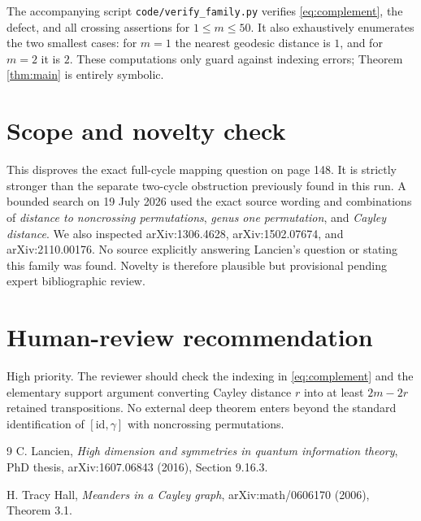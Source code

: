\documentclass[11pt]{article}
\newcommand{\id}{\mathrm{id}}
\begin{document}
The accompanying script \texttt{code/verify\_family.py} verifies
\eqref{eq:complement}, the defect, and all crossing assertions for
$1\leq m\leq50$.  It also exhaustively enumerates the two smallest cases:
for $m=1$ the nearest geodesic distance is $1$, and for $m=2$ it is $2$.
These computations only guard against indexing errors; Theorem
\ref{thm:main} is entirely symbolic.

\section{Scope and novelty check}

This disproves the exact full-cycle mapping question on page 148.  It is
strictly stronger than the separate two-cycle obstruction previously found
in this run.  A bounded search on 19 July 2026 used the exact source wording
and combinations of \emph{distance to noncrossing permutations}, \emph{genus
one permutation}, and \emph{Cayley distance}.  We also inspected
arXiv:1306.4628, arXiv:1502.07674, and arXiv:2110.00176.  No source explicitly
answering Lancien's question or stating this family was found.  Novelty is
therefore plausible but provisional pending expert bibliographic review.

\section{Human-review recommendation}

High priority.  The reviewer should check the indexing in
\eqref{eq:complement} and the elementary support argument converting Cayley
distance $r$ into at least $2m-2r$ retained transpositions.  No external deep
theorem enters beyond the standard identification of $[\id,\gamma]$ with
noncrossing permutations.

\begin{thebibliography}{9}
C. Lancien,
\emph{High dimension and symmetries in quantum information theory},
PhD thesis, arXiv:1607.06843 (2016), Section 9.16.3.

H. Tracy Hall,
\emph{Meanders in a Cayley graph},
arXiv:math/0606170 (2006), Theorem 3.1.
\end{thebibliography}
\end{document}
